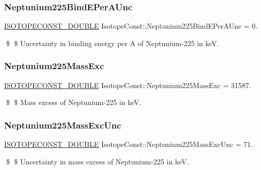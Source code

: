 \subsubsection{\texorpdfstring{Neptunium225\+Bind\+E\+Per\+A\+Unc}{Neptunium225BindEPerAUnc}}
{\footnotesize\ttfamily \mbox{\hyperlink{group___isotope_const-_macros_ga8f45a7272ce02c0b4c65c44636ed719a}{I\+S\+O\+T\+O\+P\+E\+C\+O\+N\+S\+T\+\_\+\+D\+O\+U\+B\+LE}} Isotope\+Const\+::\+Neptunium225\+Bind\+E\+Per\+A\+Unc = 0.}

\$ \$ Uncertainty in binding energy per A of Neptunium-\/225 in keV. \mbox{\label{group___isotope_const-_neptunium-_np225_ga73081ae1e022d4c2bb05f990464917d9}} 
\subsubsection{\texorpdfstring{Neptunium225\+Mass\+Exc}{Neptunium225MassExc}}
{\footnotesize\ttfamily \mbox{\hyperlink{group___isotope_const-_macros_ga8f45a7272ce02c0b4c65c44636ed719a}{I\+S\+O\+T\+O\+P\+E\+C\+O\+N\+S\+T\+\_\+\+D\+O\+U\+B\+LE}} Isotope\+Const\+::\+Neptunium225\+Mass\+Exc = 31587.}

\$ \$ Mass excess of Neptunium-\/225 in keV. \mbox{\label{group___isotope_const-_neptunium-_np225_ga5775405b709a4f9bd0f26e56f347a89b}} 
\subsubsection{\texorpdfstring{Neptunium225\+Mass\+Exc\+Unc}{Neptunium225MassExcUnc}}
{\footnotesize\ttfamily \mbox{\hyperlink{group___isotope_const-_macros_ga8f45a7272ce02c0b4c65c44636ed719a}{I\+S\+O\+T\+O\+P\+E\+C\+O\+N\+S\+T\+\_\+\+D\+O\+U\+B\+LE}} Isotope\+Const\+::\+Neptunium225\+Mass\+Exc\+Unc = 71.}

\$ \$ Uncertainty in mass excess of Neptunium-\/225 in keV. \mbox{\label{group___isotope_const-_neptunium-_np225_gabe586057df38b807059f1917ebd0f450}} 
